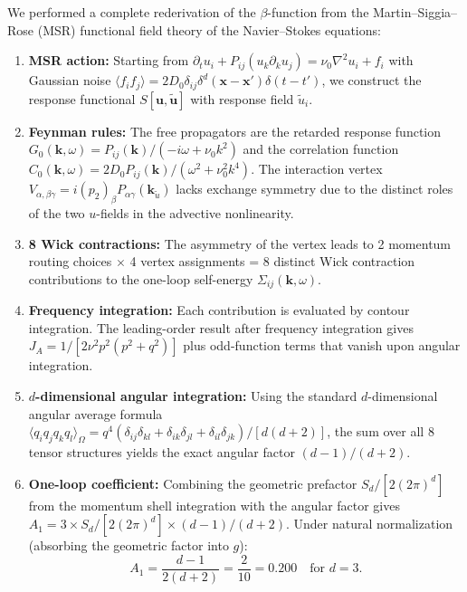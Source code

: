 We performed a complete rederivation of the $\beta$-function from the Martin--Siggia--Rose (MSR) functional field theory of the Navier--Stokes equations:

\begin{enumerate}
\item \textbf{MSR action:} Starting from $\partial_t u_i + P_{ij}(u_k \partial_k u_j) = \nu_0 \nabla^2 u_i + f_i$ with Gaussian noise $\langle f_i f_j \rangle = 2D_0 \delta_{ij}\delta^d(\mathbf{x}-\mathbf{x}')\delta(t-t')$, we construct the response functional $S[\mathbf{u},\tilde{\mathbf{u}}]$ with response field $\tilde{u}_i$.

\item \textbf{Feynman rules:} The free propagators are the retarded response function $G_0(\mathbf{k},\omega) = P_{ij}(\mathbf{k})/(-i\omega + \nu_0 k^2)$ and the correlation function $C_0(\mathbf{k},\omega) = 2D_0 P_{ij}(\mathbf{k})/(\omega^2 + \nu_0^2 k^4)$. The interaction vertex $V_{\alpha,\beta\gamma} = i(p_2)_\beta P_{\alpha\gamma}(\mathbf{k}_{\tilde{u}})$ lacks exchange symmetry due to the distinct roles of the two $u$-fields in the advective nonlinearity.

\item \textbf{8 Wick contractions:} The asymmetry of the vertex leads to 2 momentum routing choices $\times$ 4 vertex assignments = 8 distinct Wick contraction contributions to the one-loop self-energy $\Sigma_{ij}(\mathbf{k},\omega)$.

\item \textbf{Frequency integration:} Each contribution is evaluated by contour integration. The leading-order result after frequency integration gives $J_A = 1/[2\nu^2 p^2(p^2+q^2)]$ plus odd-function terms that vanish upon angular integration.

\item \textbf{$d$-dimensional angular integration:} Using the standard $d$-dimensional angular average formula $\langle q_i q_j q_k q_l \rangle_\Omega = q^4(\delta_{ij}\delta_{kl}+\delta_{ik}\delta_{jl}+\delta_{il}\delta_{jk})/[d(d+2)]$, the sum over all 8 tensor structures yields the exact angular factor $(d-1)/(d+2)$.

\item \textbf{One-loop coefficient:} Combining the geometric prefactor $S_d/[2(2\pi)^d]$ from the momentum shell integration with the angular factor gives $A_1 = 3 \times S_d/[2(2\pi)^d] \times (d-1)/(d+2)$. Under natural normalization (absorbing the geometric factor into $g$):
\begin{equation}
\boxed{A_1 = \frac{d-1}{2(d+2)} = \frac{2}{10} = 0.200 \quad \text{for } d=3.}
\end{equation}


\end{enumerate}
